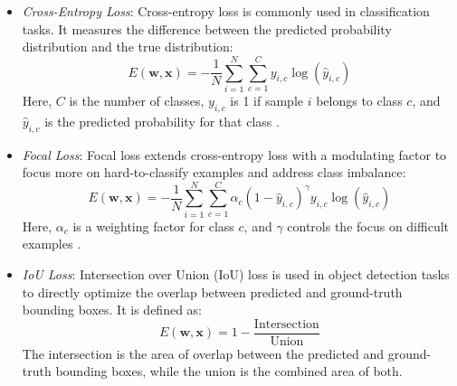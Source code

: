\begin{itemize}
    \item \textit{Cross-Entropy Loss}:  
    Cross-entropy loss is commonly used in classification tasks. It measures the difference between the predicted probability distribution and the true distribution:
    \begin{equation}
        E(\mathbf{w}, \mathbf{x}) = -\frac{1}{N} \sum_{i=1}^{N} \sum_{c=1}^{C} y_{i,c} \log(\hat{y}_{i,c})
    \end{equation}
    Here, \(C\) is the number of classes, \(y_{i,c}\) is 1 if sample \(i\) belongs to class \(c\), and \(\hat{y}_{i,c}\) is the predicted probability for that class \cite{mao2023crossentropylossfunctionstheoretical}.

    \item \textit{Focal Loss}:  
    Focal loss extends cross-entropy loss with a modulating factor to focus more on hard-to-classify examples and address class imbalance:
    \begin{equation}
        E(\mathbf{w}, \mathbf{x}) = -\frac{1}{N} \sum_{i=1}^{N} \sum_{c=1}^{C} \alpha_c (1 - \hat{y}_{i,c})^\gamma y_{i,c} \log(\hat{y}_{i,c})
    \end{equation}
    Here, \(\alpha_c\) is a weighting factor for class \(c\), and \(\gamma\) controls the focus on difficult examples \cite{DBLP:journals/corr/abs-1708-02002}.

    \item \textit{IoU Loss}:  
    Intersection over Union (IoU) loss is used in object detection tasks to directly optimize the overlap between predicted and ground-truth bounding boxes. It is defined as:
    \begin{equation}
        E(\mathbf{w}, \mathbf{x}) = 1 - \frac{\text{Intersection}}{\text{Union}}
    \end{equation}
    The intersection is the area of overlap between the predicted and ground-truth bounding boxes, while the union is the combined area of both.

\end{itemize}


